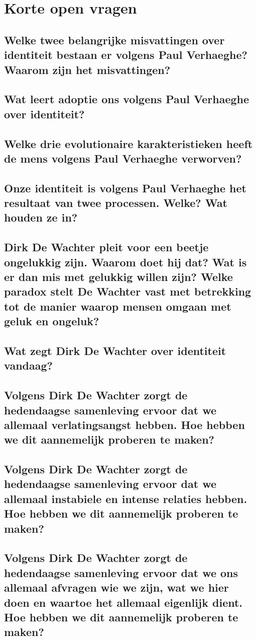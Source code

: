 \documentclass[main.tex]{subfiles}
\begin{document}
\section{Korte open vragen}

\subsection{Welke twee belangrijke misvattingen over identiteit bestaan er volgens Paul Verhaeghe? Waarom zijn het misvattingen?}
\subsection{Wat leert adoptie ons volgens Paul Verhaeghe over identiteit?}
\subsection{Welke drie evolutionaire karakteristieken heeft de mens volgens Paul Verhaeghe verworven?}
\subsection{Onze identiteit is volgens Paul Verhaeghe het resultaat van twee processen. Welke? Wat houden ze in?}
\subsection{Dirk De Wachter pleit voor een beetje ongelukkig zijn. Waarom doet hij dat? Wat is er dan mis met gelukkig willen zijn? Welke paradox stelt De Wachter vast met betrekking tot de manier waarop mensen omgaan met geluk en ongeluk?}
\subsection{Wat zegt Dirk De Wachter over identiteit vandaag?}
\subsection{Volgens Dirk De Wachter zorgt de hedendaagse samenleving ervoor dat we allemaal verlatingsangst hebben. Hoe hebben we dit aannemelijk proberen te maken?}
\subsection{Volgens Dirk De Wachter zorgt de hedendaagse samenleving ervoor dat we allemaal instabiele en intense relaties hebben. Hoe hebben we dit aannemelijk proberen te maken?}
\subsection{Volgens Dirk De Wachter zorgt de hedendaagse samenleving ervoor dat we ons allemaal afvragen wie we zijn, wat we hier doen en waartoe het allemaal eigenlijk dient. Hoe hebben we dit aannemelijk proberen te maken?}
\end{document}
